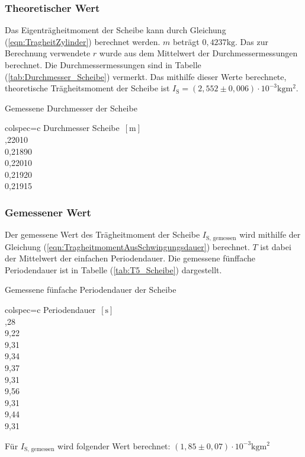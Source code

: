     \subsubsection{Theoretischer Wert}
    Das Eigenträgheitmoment der Scheibe kann durch Gleichung (\ref{eqn:TragheitZylinder}) berechnet werden. $m$ beträgt $0,4237 \unit{\kilo\gram}$.
    Das zur Berechnung verwendete $r$ wurde aus dem Mittelwert der Durchmessermessungen berechnet. 
    Die Durchmessermessungen sind in Tabelle (\ref{tab:Durchmesser_Scheibe}) vermerkt. Das mithilfe dieser Werte berechnete, theoretische 
    Trägheitsmoment der Scheibe ist $I_{\text{S}} = (2,552 \pm 0,006) \cdot 10^{-3} \unit{\kilo\gram\meter\squared}$. 
    \begin{table}[H]
      \centering 
      \caption{Gemessene Durchmesser der Scheibe}
      \label{tab:Durchmesser_Scheibe}
      \begin{tblr}{colspec={c}}
          \toprule
          Durchmesser Scheibe $\,[\unit{\meter}]$ \\
          ,22010 \\
          0,21890 \\
          0,22010 \\
          0,21920 \\
          0,21915 \\
          \bottomrule
      \end{tblr}
    \end{table}
    \subsubsection{Gemessener Wert}
    Der gemessene Wert des Trägheitmoment der Scheibe $I_{\text{S, gemessen}}$ wird mithilfe der Gleichung (\ref{eqn:TragheitmomentAusSchwingungsdauer}) berechnet.
    $T$ ist dabei der Mittelwert der einfachen Periodendauer. Die gemessene fünffache Periodendauer ist in Tabelle (\ref{tab:T5_Scheibe}) dargestellt.
    \begin{table}[H]
      \centering 
      \caption{Gemessene fünfache Periodendauer der Scheibe}
      \label{tab:T5_Scheibe}
      \begin{tblr}{colspec={c}}
          \toprule
          Periodendauer $\,[\unit{\second}]$ \\
          ,28 \\
          9,22 \\
          9,31 \\
          9,34 \\
          9,37 \\
          9,31 \\
          9,56 \\
          9,31 \\
          9,44 \\
          9,31 \\
          \bottomrule
      \end{tblr}
    \end{table}
    Für $I_{\text{S, gemessen}}$ wird folgender Wert berechnet: 
    $(1,85 \pm 0,07) \cdot 10^{-3} \unit{\kilo\gram\meter\squared}$ 
  
